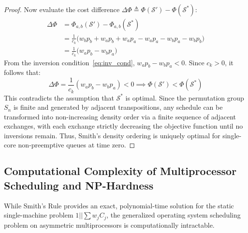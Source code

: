 \documentclass[conference]{IEEEtran}
\begin{document}
\begin{proof}
Now evaluate the cost difference $\Delta \Phi \triangleq \Phi(\mathcal{S}') - \Phi(\mathcal{S}^*)$:
\begin{align}
\Delta \Phi &= \Phi_{a,b}(\mathcal{S}') - \Phi_{a,b}(\mathcal{S}^*) \nonumber \\
&= \frac{1}{c_k} \Big( w_b p_b + w_a p_b + w_a p_a - w_a p_a - w_b p_a - w_b p_b \Big) \nonumber \\
&= \frac{1}{c_k} \Big( w_a p_b - w_b p_a \Big)
\end{align}
From the inversion condition~\eqref{eq:inv_cond}, $w_a p_b - w_b p_a < 0$. Since $c_k > 0$, it follows that:
\begin{equation}
\Delta \Phi = \frac{1}{c_k}(w_a p_b - w_b p_a) < 0 \implies \Phi(\mathcal{S}') < \Phi(\mathcal{S}^*)
\end{equation}
This contradicts the assumption that $\mathcal{S}^*$ is optimal. Since the permutation group $S_n$ is finite and generated by adjacent transpositions, any schedule can be transformed into non-increasing density order via a finite sequence of adjacent exchanges, with each exchange strictly decreasing the objective function until no inversions remain. Thus, Smith's density ordering is uniquely optimal for single-core non-preemptive queues at time zero.
\end{proof}

\subsection{Computational Complexity of Multiprocessor Scheduling and NP-Hardness}
\label{sec:np_hardness}
While Smith's Rule provides an exact, polynomial-time solution for the static single-machine problem $1 || \sum w_j C_j$, the generalized operating system scheduling problem on asymmetric multiprocessors is computationally intractable.
\end{document}
